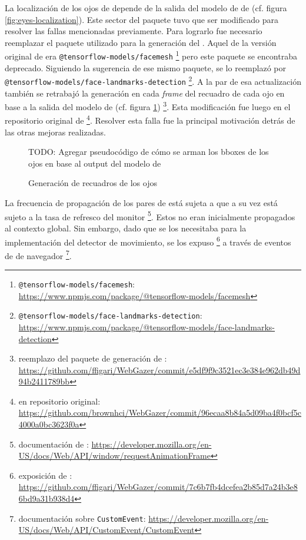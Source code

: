 La localización de los ojos de \webgazer depende de la salida del modelo de
\facemesh de \tfjs (cf. figura \ref{fig:eyes-localization}).
Este sector del paquete tuvo que ser modificado para resolver las fallas
mencionadas previamente.
Para lograrlo fue necesario reemplazar el paquete utilizado para la generación
del \facemesh.
Aquel de la versión original de \webgazer era
\texttt{@tensorflow-models/facemesh}
\footnote{\texttt{@tensorflow-models/facemesh}:
\url{https://www.npmjs.com/package/@tensorflow-models/facemesh}} pero este
paquete se encontraba deprecado.
Siguiendo la sugerencia de ese mismo paquete, se lo reemplazó por
\texttt{@tensorflow-models/face-landmarks-detection}
\footnote{\texttt{@tensorflow-models/face-landmarks-detection}:
\url{https://www.npmjs.com/package/@tensorflow-models/face-landmarks-detection}}.
A la par de esa actualización también se retrabajó la generación en cada
\textit{frame} del recuadro de cada ojo en base a la salida del modelo de
\facemesh (cf. figura \ref{fig:facemesh-to-eyes-bbox}) \footnote{reemplazo del
paquete de generación de \facemesh:
\url{https://github.com/ffigari/WebGazer/commit/e5df9f9c3521ec3e384e962db49d94b2411789bb}}.
Esta modificación fue luego \mergeada en el repositorio original de \webgazer
\footnote{\merge en repositorio original:
\url{https://github.com/brownhci/WebGazer/commit/96ecaa8b84a5d09ba4f0bcf5c4000a0bc3623f0a}}.
Resolver esta falla fue la principal motivación detrás de las otras mejoras
realizadas.

\begin{figure}
  TODO: Agregar pseudocódigo de cómo se arman los bboxes de los ojos en base al
        output del modelo de \facemesh

  \caption{Generación de recuadros de los ojos}
  \label{fig:facemesh-to-eyes-bbox}
\end{figure}

La frecuencia de propagación de los pares de \features está sujeta a \raf que a
su vez está sujeto a la tasa de refresco del monitor \footnote{documentación de
\raf:
\url{https://developer.mozilla.org/en-US/docs/Web/API/window/requestAnimationFrame}}.
Estos \features no eran inicialmente propagados al contexto global.
Sin embargo, dado que se los necesitaba para la implementación del detector de
movimiento, se los expuso \footnote{exposición de \features:
\url{https://github.com/ffigari/WebGazer/commit/7c6b7fb4dcefea2b85d7a24b3e86bd9a31b938d4}}
a través de eventos de \js de navegador \footnote{documentación sobre
\texttt{CustomEvent}:
\url{https://developer.mozilla.org/en-US/docs/Web/API/CustomEvent/CustomEvent}}.

